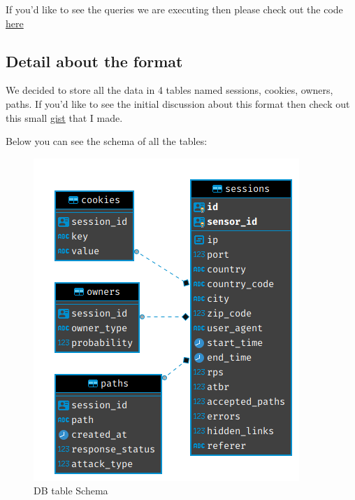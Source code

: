 If you’d like to see the queries we are executing then please check out the code \href{https://github.com/mushorg/tanner/blob/develop/tanner/api/api.py#L49}{here}
\subsection{Detail about the format}
We decided to store all the data in 4 tables named sessions, cookies, owners, paths. If you'd like to see the initial discussion about this format then check out this small \href{https://gist.github.com/mzfr/e7cb772a6c452a12c75230430260022b}{gist} that I made.

Below you can see the schema of all the tables:

\begin{figure}[h!]
    \centering
    \includegraphics[width=.5\textwidth]{table}
    \caption{DB table Schema}
    \label{fig:3}
\end{figure}
\vfill